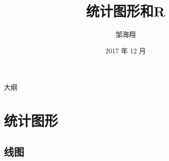 \documentclass{beamerthemeMono}
\begin{document}
 \title[统计图形和R]%
 {\erhao 统计图形和R\\[2ex]}

 \author[邹海翔] %
 {邹海翔}




 \date{2017 年 12 月}


 \begin{frame}[plain]
   \titlepage
 \end{frame}

 \begin{frame}{大纲}{}
   {\tableofcontents[hideallsubsections]}
 \end{frame}

 \section{统计图形}
 \subsection{线图}
\end{document}

